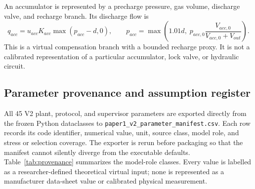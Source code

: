 \documentclass[machines,article,submit,pdftex,moreauthors]{Definitions/mdpi}
\begin{document}
An accumulator is represented by a precharge pressure, gas volume, discharge valve, and recharge branch. Its discharge flow is
\begin{equation}
q_{acc}=u_{acc}K_{acc}\max(p_{acc}-d,0),\qquad
p_{acc}=\max\left(1.01d,\;p_{acc,0}\frac{V_{acc,0}}{V_{acc,0}+V_{out}}\right).
\end{equation}
This is a virtual compensation branch with a bounded recharge proxy. It is not a calibrated representation of a particular accumulator, lock valve, or hydraulic circuit.

\subsection{Parameter provenance and assumption register}
All 45 V2 plant, protocol, and supervisor parameters are exported directly from the frozen Python dataclasses to \texttt{paper1\_v2\_parameter\_manifest.csv}. Each row records its code identifier, numerical value, unit, source class, model role, and stress or selection coverage. The exporter is rerun before packaging so that the manifest cannot silently diverge from the executable defaults. Table~\ref{tab:provenance} summarizes the model-role classes. Every value is labelled as a researcher-defined theoretical virtual input; none is represented as a manufacturer data-sheet value or calibrated physical measurement.

\begin{table}[H]
\centering
\caption{Traceable V2 parameter roles exported from the frozen virtual prototype.}
\label{tab:provenance}
\end{table}
\end{document}
